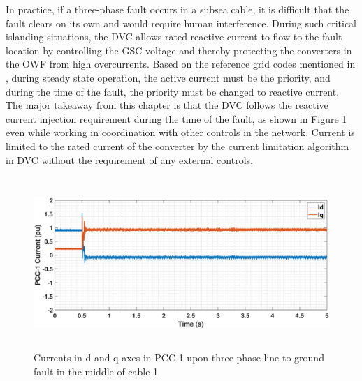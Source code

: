 In practice, if a three-phase fault occurs in a subsea cable, it is difficult that the fault clears on its own and would require human interference. During such critical islanding situations, the \gls{DVC} allows rated reactive current to flow to the fault location by controlling the \gls{GSC} voltage and thereby protecting the converters in the \gls{OWF} from high overcurrents. Based on the reference grid codes mentioned in \cite{mohseni_review_2012}, during steady state operation, the active current must be the priority, and during the time of the fault, the priority must be changed to reactive current. The major takeaway from this chapter is that the \gls{DVC} follows the reactive current injection requirement during the time of the fault, as shown in Figure \ref{IDQ_WT1_3phaseSC} even while working in coordination with other controls in the network. Current is limited to the rated current of the converter by the current limitation algorithm in \gls{DVC} without the requirement of any external controls. %

\vspace{-3mm}
\begin{figure}[H]
    \includegraphics[height = 6.5cm,width = \textwidth]{Diagrams/Chapter_5/IDQ_WT1_3phaseSC_2.eps}
    \caption{Currents in d and q axes in PCC-1 upon three-phase line to ground fault in the middle of cable-1}
    \label{IDQ_WT1_3phaseSC}
\end{figure}


